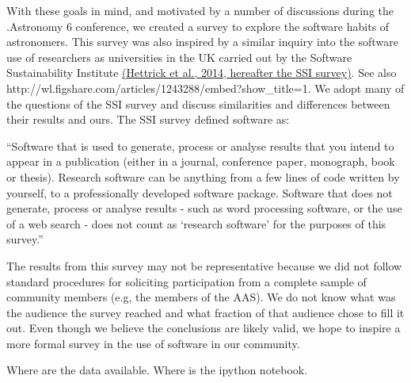 With these goals in mind, and motivated by a number of discussions during the .Astronomy 6 conference, we created a survey to explore the software habits of astronomers. This survey was also inspired by a similar inquiry into the software use of researchers as universities in the UK carried out by the Software Sustainability Institute \href{(http://www.software.ac.uk/blog/2014-12-04-its-impossible-conduct-research-without-software-say-7-out-10-uk-researchers#comment-14813}{(Hettrick et al., 2014, hereafter the SSI survey)}. See also http://wl.figshare.com/articles/1243288/embed?show_title=1. We adopt many of the questions of the SSI survey and discuss similarities and differences between their results and ours. The SSI survey defined software as:

“Software that is used to generate, process or analyse results that you intend to appear in a publication (either in a journal, conference paper, monograph, book or thesis). Research software can be anything from a few lines of code written by yourself, to a professionally developed software package. Software that does not generate, process or analyse results - such as word processing software, or the use of a web search - does not count as ‘research software’ for the purposes of this survey.”

The results from this survey may not be representative because we did not follow standard procedures for soliciting participation from a complete sample of community members (e.g, the members of the AAS). We do not know what was the audience the survey reached and what fraction of that audience chose to fill it out. Even though we believe the conclusions are likely valid, we hope to inspire a more formal survey in the use of software in our community.

Where are the data available. Where is the ipython notebook.
